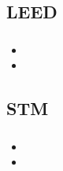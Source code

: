 \documentclass{beamer}
\begin{document}
\subsection[Ergebnisse]{LEED}

\begin{frame}
\frametitle{}
\begin{itemize}
  \item
  \item
\end{itemize}
\end{frame}



\subsection[Ergebnisse]{STM}

\begin{frame}
\frametitle{}
\begin{itemize}
  \item
  \item
\end{itemize}
\end{frame}












\end{document}

